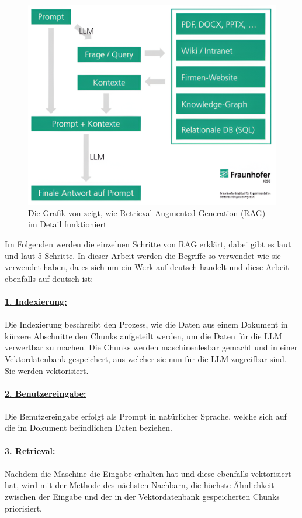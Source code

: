 \documentclass[12pt,toc=bib,toc=listof]{scrreprt}
\begin{document}
\begin{figure} [H]
    \centering
    \includegraphics[width=0.75\linewidth]{./Bilder/Honroth_Wie funktioniert Retrieval Augmented Generation (RAG) im Detail.png}
    \caption{Die Grafik von \textcite{Honroth2024} zeigt, wie Retrieval Augmented Generation (RAG) im Detail funktioniert}
    \label{fig:enter-label}
\end{figure}
\noindent Im Folgenden werden die einzelnen Schritte von RAG erklärt, dabei gibt es laut \textcite{Schmid2024} und laut \textcite{Miesle2023} 5 Schritte. In dieser Arbeit werden die Begriffe so verwendet wie sie \textcite{Schmid2024} verwendet haben, da es sich um ein Werk auf deutsch handelt und diese Arbeit ebenfalls auf deutsch ist:\\
\\
\textbf{\underline{1. Indexierung:}}\\
\\
Die Indexierung beschreibt den Prozess, wie die Daten aus einem Dokument in kürzere Abschnitte den Chunks aufgeteilt werden, um die Daten für die LLM verwertbar zu machen. Die Chunks werden maschinenlesbar gemacht und in einer Vektordatenbank gespeichert, aus welcher sie nun für die LLM zugreifbar sind. Sie werden vektorisiert.\\
\\
\textbf{\underline{2. Benutzereingabe:}}\\
\\
Die Benutzereingabe erfolgt als Prompt in natürlicher Sprache, welche sich auf die im Dokument befindlichen Daten beziehen.\\
\\
\textbf{\underline{3. Retrieval:}}\\
\\
Nachdem die Maschine die Eingabe erhalten hat und diese ebenfalls vektorisiert hat, wird mit der Methode des nächsten Nachbarn, die höchste Ähnlichkeit zwischen der Eingabe und der in der Vektordatenbank gespeicherten Chunks priorisiert.\\
\end{document}
